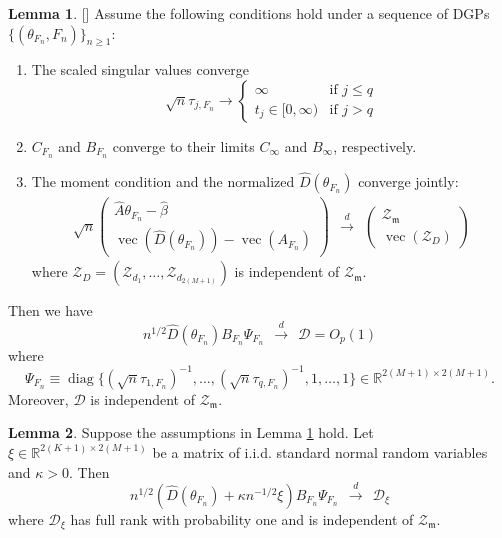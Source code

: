 \documentclass[11pt]{article}
\theoremstyle{definition}
\newtheorem{lemma}{Lemma}[section]
\DeclareMathOperator*{\diag}{diag}
\newcommand{\R}{\ensuremath{\mathbb{R}}}
\newcommand{\0}{\ensuremath{\mathbf{0}}}
\begin{document}
\begin{bibunit}
%

%
\begin{lemma}
\label{lem:cond_stat}[\citet[Lemma 10.3]{andrews/guggenberger:2017}]
Assume the following conditions hold under a sequence of DGPs $\{(\theta_{F_n}, F_n)\}_{n\geq 1}$:
\begin{enumerate}
\item The scaled singular values converge
\[
	\sqrt{n}\tau_{j,F_n} \to 
	\begin{cases}
		\infty & \text{if } j \leq q \\
		t_j \in [0,\infty) & \text{if } j > q
	\end{cases}
\]
\item $C_{F_n}$ and $B_{F_n}$ converge to their limits $C_{\infty}$ and $B_{\infty}$, respectively.
\item The moment condition and the normalized $\hat{D}(\theta_{F_n})$ converge jointly:
\begin{align*}
	\sqrt{n}
	\begin{pmatrix}
		\hat{A}\theta_{F_n} - \hat{\beta} \\
		\operatorname*{vec}(\hat{D}(\theta_{F_n})) - \operatorname*{vec}(A_{F_n})
	\end{pmatrix}
	~~\xrightarrow{d}~~
	\begin{pmatrix}
		\mathcal{Z}_{\mathfrak{m}} \\
		\operatorname{vec}(\mathcal{Z}_D)
	\end{pmatrix}
\end{align*}
where $\mathcal{Z}_D = (\mathcal{Z}_{d_1}, \ldots, \mathcal{Z}_{d_{2(M+1)}})$ is independent of $\mathcal{Z}_{\mathfrak{m}}$.
\end{enumerate}
Then we have
\[
	n^{1/2}\hat{D}(\theta_{F_n}) B_{F_n} \Psi_{F_n} ~~\xrightarrow{d}~~ \mathcal{D} = O_p(1)
\]
where
\[
	\Psi_{F_n} \equiv \diag\{(\sqrt{n}\tau_{1,F_n})^{-1},\ldots, (\sqrt{n}\tau_{q,F_n})^{-1}, 1,\ldots, 1\} \in \R^{2(M+1)\times 2(M+1)}.
\]
Moreover, $\mathcal{D}$ is independent of $\mathcal{Z}_{\mathfrak{m}}$.
\end{lemma}


%
\begin{lemma}
	\label{lem:new_cond_stat}
	Suppose the assumptions in Lemma \ref{lem:cond_stat} hold. Let $\xi\in\R^{2(K+1)\times 2(M+1)}$ be a matrix of i.i.d. standard normal random variables and $\kappa > 0$. Then 
	\[
		n^{1/2} (\hat{D}(\theta_{F_n}) + \kappa n^{-1/2}\xi) B_{F_n} \Psi_{F_n} 
		~~\xrightarrow{d}~~
		\mathcal{D}_\xi	
	\]
	where $\mathcal{D}_\xi$ has full rank with probability one and is independent of $\mathcal{Z}_{\mathfrak{m}}$.
\end{lemma}


\end{bibunit}
\end{document}
